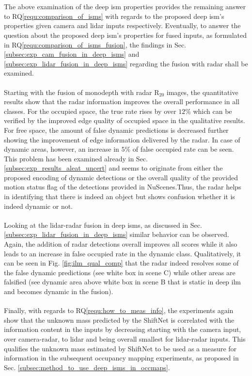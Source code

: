 \\\\
The above examination of the deep \gls{ism} properties provides the remaining answer to RQ\ref{requ:comparison_of_isms} with regards to the proposed deep \gls{ism}'s properties given camera and lidar inputs respectively. Eventually, to answer the question about the proposed deep \gls{ism}'s properties for fused inputs, as formulated in RQ\ref{requ:comparison_of_isms_fusion}, the findings in Sec. \ref{subsec:exp_cam_fusion_in_deep_isms} and \ref{subsec:exp_lidar_fusion_in_deep_isms} regarding the fusion with radar shall be examined.
\\\\
Starting with the fusion of \gls{monodepth} with radar R$_{20}$ images, the quantitative results show that the radar information improves the overall performance in all classes. For the occupied space, the true rate rises by over $12\%$ which can be verified by the improved edge quality of occupied space in the qualitative results. For free space, the amount of false dynamic predictions is decreased further showing the improvement of edge information delivered by the radar. In case of dynamic areas, however, an increase in $5\%$ of false occupied rate can be seen. This problem has been examined already in Sec. \ref{subsec:exp_results_aleat_uncert} and seems to originate from either the proposed encoding of dynamic detections or the overall quality of the provided motion status flag of the detections provided in NuScenes.Thus, the radar helps in identifying that there is indeed an object but shows confusion whether it is indeed dynamic or not.  
\\\\
Looking at the lidar-radar fusion in deep \gls{ism}s, as discussed in Sec. \ref{subsec:exp_lidar_fusion_in_deep_isms} similar behavior can be observed. Again, the addition of radar detections overall improves all scores while it also leads to an increase in false occupied rate in the dynamic class. Qualitatively, it can be seen in Fig. \ref{fig:ilm_qual_comp} that the radar indeed resolves some of the false dynamic predictions (see white box in scene C) while other areas are falsified (see dynamic area above white box in scene B that is static in deep \gls{ilm} and becomes dynamic in the fusion).
\\\\
Finally, with regards to RQ\ref{requ:how_to_meas_info}, the experiments again show that the unknown mass predicted by the ShiftNet is correlated with the information content in the inputs by decreasing starting with the camera input, over camera-radar, to lidar and being overall smallest for lidar-radar inputs. This qualifies the unknown mass estimated by ShiftNet to be used as a measure for information in the subsequent occupancy mapping experiments, as proposed in Sec. \ref{subsec:method_to_use_deep_isms_in_occmaps}.